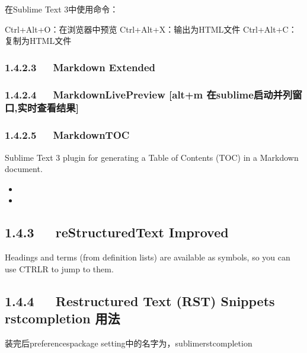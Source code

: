 \documentclass[letterpaper,12pt,english]{sphinxmanual}
\begin{document}
在Sublime Text 3中使用命令：

\begin{sphinxVerbatim}[commandchars=\\\{\}]
Ctrl+Alt+O：在浏览器中预览
Ctrl+Alt+X：输出为HTML文件
Ctrl+Alt+C：复制为HTML文件
\end{sphinxVerbatim}


\subsubsection{1.4.2.3   Markdown Extended}
\label{\detokenize{001software/001install/sublime:markdown-extended}}

\subsubsection{1.4.2.4   MarkdownLivePreview {[}alt+m 在sublime启动并列窗口,实时查看结果{]}}
\label{\detokenize{001software/001install/sublime:markdownlivepreview-alt-m-sublime}}

\subsubsection{1.4.2.5   MarkdownTOC}
\label{\detokenize{001software/001install/sublime:markdowntoc}}
Sublime Text 3 plugin for generating a Table of Contents (TOC) in a
Markdown document.
\begin{itemize}
\item {} 

\item {} 

\end{itemize}


\subsection{1.4.3   reStructuredText Improved}
\label{\detokenize{001software/001install/sublime:restructuredtext-improved}}
Headings and terms (from definition lists) are available as symbols, so
you can use CTRL\sphinxhyphen{}R to jump to them.


\subsection{1.4.4   Restructured Text (RST) Snippets rst\sphinxhyphen{}completion 用法}
\label{\detokenize{001software/001install/sublime:restructured-text-rst-snippets-rst-completion}}
装完后preferences\sphinxhyphen{}package setting中的名字为，sublime\sphinxhyphen{}rst\sphinxhyphen{}completion
\end{document}
